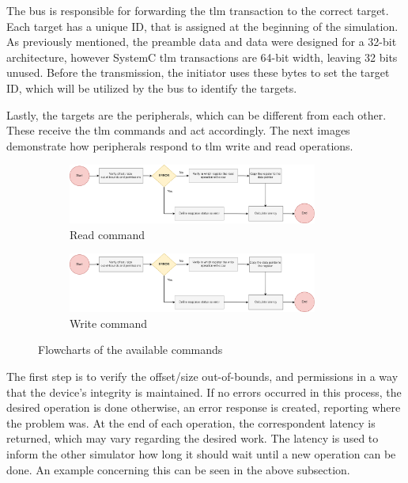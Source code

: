 The bus is responsible for forwarding the \gls{tlm} transaction to the correct target. Each target has a unique ID, that is assigned 
at the beginning of the simulation. As previously mentioned, the preamble data and data were designed for a 32-bit architecture, however 
SystemC \gls{tlm} transactions are 64-bit width, leaving 32 bits unused. Before the transmission, the initiator uses these bytes to set the 
target ID, which will be utilized by the bus to identify the targets.

Lastly, the targets are the peripherals, which can be different from each other. These receive the 
\gls{tlm} commands and act accordingly. The next images demonstrate how peripherals respond to \gls{tlm} write and read operations. 

\begin{figure}[H]
	\centering
	\begin{subfigure}{\textwidth}
		\centering
		\includegraphics[width=0.9\textwidth]{Images/CoSimReadOperation.png}
 		\caption[1\textwidth]{Read command}
	\end{subfigure}
	\begin{subfigure}{\textwidth}
		\centering
		\includegraphics[width=0.9\textwidth]{Images/CoSimWriteOperation.png}
		\caption[1\textwidth]{Write command}
	\end{subfigure}
		
	\caption{Flowcharts of the available commands}
\end{figure}

The first step is to verify the offset/size out-of-bounds, and permissions in a way that the device's integrity is maintained. If no errors occurred 
in this process, the desired operation is done otherwise, an error response is created, reporting where the problem was. 
At the end of each operation, the correspondent latency is returned, which may vary regarding the desired work. The latency is used to inform the 
other simulator how long it should wait until a new operation can be done. An example concerning this can be seen in the above subsection.  

